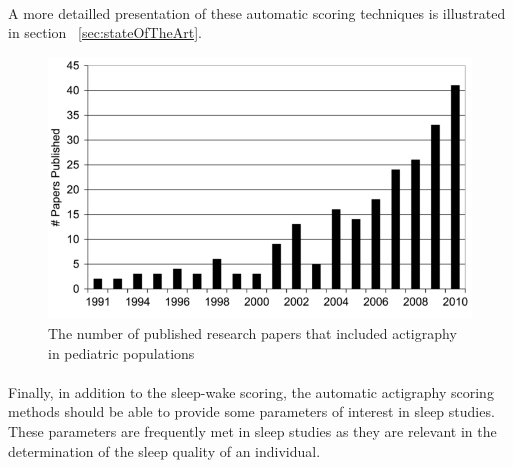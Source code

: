 \documentclass[a4paper,12pt]{article}
\begin{document}
\paragraph{}
A more detailled presentation of these automatic scoring techniques is illustrated in section ~\ref{sec:stateOfTheArt}.

\begin{figure}[H]
\centering
\includegraphics[scale=0.5]{Images/actiStudies.png}
\caption{The number of published research papers that included actigraphy in pediatric populations}
\label{actiStudies}
\end{figure}



\paragraph{}
Finally, in addition to the sleep-wake scoring, the automatic actigraphy scoring methods should be able to provide some parameters of interest in sleep studies. These parameters are frequently met in sleep studies as they are relevant in the determination of the sleep quality of an individual.
\end{document}
